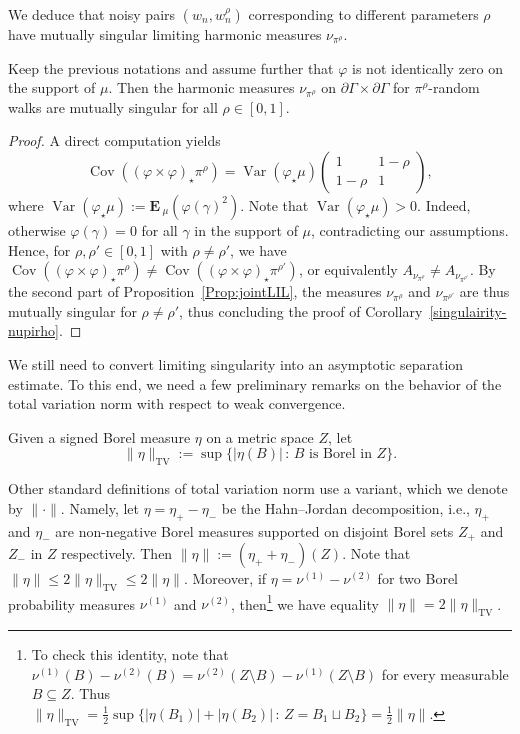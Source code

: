\documentclass[AHL,Unicode,longabstracts,published]{cedram}
\DeclareMathOperator{\TV}{TV}
\DeclareMathOperator{\Var}{Var}
\DeclareMathOperator{\Cov}{Cov}
\newcommand{\f}{\varphi}
\newcommand{\Eb}{\mathbf{E}\,}
\renewcommand{\(}{\left(}
\renewcommand{\)}{\right)}
\begin{document}
We deduce that noisy pairs $(w_{n}, w_{n}^{\rho})$ corresponding to different parameters $\rho$ have mutually singular limiting harmonic measures $\nu_{\pi^{\rho}}$.


\begin{coro}\label{singulairity-nupirho}
Keep the previous notations and assume further that $\f$ is not identically zero on the support of $\mu$. Then the harmonic measures $\nu_{\pi^\rho}$ on $\partial \Gamma \times \partial \Gamma$ for $\pi^\rho$-random walks are mutually singular for all $\rho \in [0, 1]$.
\end{coro}


\begin{proof}
A direct computation yields
\[
\Cov((\f\times \f)_\star\pi^\rho)=\Var (\f_{\star}\mu)
\begin{pmatrix}
1 & 1-\rho\\
1-\rho & 1
\end{pmatrix},
\]
where $\Var (\f_{\star} \mu):=\Eb_{\mu}(\f(\gamma)^2)$. Note that $\Var (\f_{\star} \mu)>0$. Indeed, otherwise $\f(\gamma)=0$ for all $\gamma$ in the support of $\mu$, contradicting our assumptions. Hence, for $\rho, \rho' \in [0, 1]$ with $\rho \neq \rho'$, we have $\Cov((\f\times\f)_\star\pi^\rho) \neq \Cov((\f\times \f)_\star \pi^{\rho'})$, or equivalently $A_{\nu_{\pi^\rho}}\neq A_{\nu_{\pi^{\rho'}}}$. By the second part of Proposition~\ref{Prop:jointLIL}, the measures $\nu_{\pi^\rho}$ and $\nu_{\pi^{\rho'}}$ are thus mutually singular for $\rho\neq \rho'$, thus concluding the proof of Corollary~\ref{singulairity-nupirho}.
\end{proof}

We still need to convert limiting singularity into an asymptotic separation estimate. To this end, we need a few preliminary remarks on the behavior of the total variation norm with respect to weak convergence.

Given a signed Borel measure $\eta$ on a metric space $Z$, let
\[
\|\eta\|_{\TV}:=\sup\{|\eta(B)| \,:\, \text{$B$ is Borel in $Z$}\}.
\]

\begin{rema}\label{Rem:TV}
Other standard definitions of total variation norm use a variant, which we denote by $\|\cdot\|$. Namely,
let $\eta=\eta_+ - \eta_-$ be the Hahn--Jordan decomposition, i.e., $\eta_+$ and $\eta_-$ are non-negative Borel measures supported on disjoint Borel sets $Z_+$ and $Z_-$ in $Z$ respectively. Then $\|\eta\|:=(\eta_+ + \eta_-)(Z)$. Note that $\|\eta\| \leq 2\|\eta\|_{\TV}\leq 2\|\eta\|$. Moreover, if $\eta=\nu^{(1)}-\nu^{(2)}$ for two Borel probability measures $\nu^{(1)}$ and $\nu^{(2)}$, then\footnote{To check this identity, note that $\nu^{(1)}(B)-\nu^{(2)}(B)=\nu^{(2)}(Z\setminus B)-\nu^{(1)}(Z\setminus B)$ for every measurable $B\subseteq Z$. Thus $\|\eta\|_{\TV}=\frac{1}{2}\sup\{|\eta(B_{1})|+|\eta(B_{2})| \, : \, Z=B_{1}\sqcup B_{2}\}= \frac{1}{2}\|\eta\|$. } we have equality $\|\eta\| = 2\|\eta\|_{\TV}$.
\end{rema}
\end{document}
